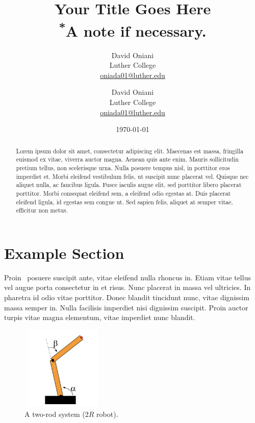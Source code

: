 \documentclass{article}
\author{David Oniani\\
        Luther College\\
        \href{mailto:oniada01@luther.edu}{oniada01@luther.edu}
        \and
        David Oniani\\
        Luther College\\
        \href{mailto:oniada01@luther.edu}{oniada01@luther.edu}}
\title{\textbf{Your Title Goes Here}\\
      {\small\textsuperscript{*}A note if necessary.}}
\date{\today}
\begin{document}
\maketitle


\begin{abstract}

\noindent Lorem ipsum dolor sit amet, consectetur adipiscing elit. Maecenas
est massa, fringilla euismod ex vitae, viverra auctor magna. Aenean quis ante
enim. Mauris sollicitudin pretium tellus, non scelerisque urna. Nulla posuere
tempus nisl, in porttitor eros imperdiet et. Morbi eleifend vestibulum felis,
ut suscipit nunc placerat vel. Quisque nec aliquet nulla, ac faucibus ligula.
Fusce iaculis augue elit, sed porttitor libero placerat porttitor. Morbi
consequat eleifend sem, a eleifend odio egestas at. Duis placerat eleifend
ligula, id egestas sem congue ut. Sed sapien felis, aliquet at semper vitae,
efficitur non metus.
\end{abstract}


\newpage
\tableofcontents
\newpage


\section{Example Section}

Proin~\cite{munkres2000} posuere suscipit ante, vitae eleifend nulla rhoncus
in. Etiam vitae tellus vel augue porta consectetur in et risus. Nunc placerat
in massa vel ultricies. In pharetra id odio vitae porttitor. Donec blandit
tincidunt nunc, vitae dignissim massa semper in. Nulla facilisis imperdiet nisi
dignissim suscipit. Proin auctor turpis vitae magna elementum, vitae imperdiet
nunc blandit.

\begin{figure}[h]
  \centering
  \includegraphics[width=4cm, height=4cm]{image/two-rod-system}
  \caption{A two-rod system ($2R$ robot).}
\end{figure}
\end{document}
